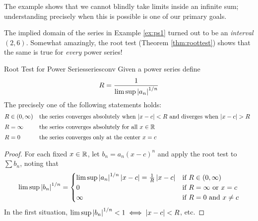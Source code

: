 The example shows that we cannot blindly take limits inside an infinite sum; understanding precisely when this is possible is one of our primary goals. 


\goodbreak



The implied domain of the series in Example \ref{ex:ps1} turned out to be an \emph{interval} $(2,6)$. Somewhat amazingly, the root test (Theorem \ref{thm:roottest}) shows that the same is true for \emph{every} power series!

\begin{thm}{Root Test for Power Series}{seriesconv}
	Given a power series  define\footnotemark
	\[
		R=\frac 1{\limsup\left| a_n\right|^{1/n}}
	\]
	The precisely one of the following statements holds:
	\[
		\begin{array}{@{}ll}
			R\in(0,\infty)&\text{the series converges absolutely when $\nm{x-c}<R$ and diverges when $\nm{x-c}>R$}\\[5pt]
			R=\infty&\text{the series converges absolutely for all $x\in\R$}\\[5pt]
			R=0&\text{the series converges only at the center $x=c$}
		\end{array}
	\]
\end{thm}


\begin{proof}
	For each fixed $x\in\mathbb{R}$, let $b_n=a_n(x-c)^n$ and apply the root test to $\sum b_n$, noting that
	\begin{gather*}
		\limsup\left| b_n\right|^{1/n}=
		\begin{cases}
			\limsup\left| a_n\right|^{1/n}\left| x-c\right|=\frac 1R\left| x-c\right|&\text{if $R\in(0,\infty)$}\\
			0&\text{if }R=\infty\text{ or }x=c\\
			\infty&\text{if }R=0\text{ and }x\neq c
		\end{cases}
	\end{gather*}
	In the first situation, $\limsup\left| b_n\right|^{1/n}<1\iff \left| x-c\right|<R$, etc.
\end{proof}

